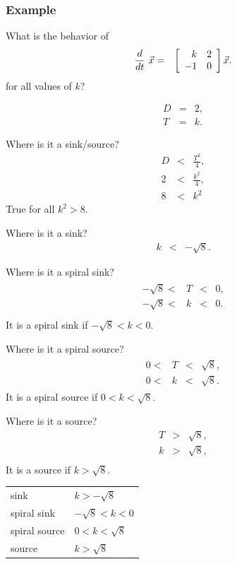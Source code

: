 \begin{frame}
  \frametitle{Example}

  What is the behavior of
  \begin{eqnarray*}
    \deriv{~}{t} \vec{x} & = & \arrayTwo{k}{2}{-1}{0} \vec{x}.
  \end{eqnarray*}
  for all values of $k$?


  {
    \begin{eqnarray*}
      D & = & 2, \\
      T & = & k.
    \end{eqnarray*}
  }



  {
    Where is it a sink/source?
    \begin{eqnarray*}
      D & < & \frac{T^2}{4}, \\
      2 & < & \frac{k^2}{4}, \\
      8 & < & k^2
    \end{eqnarray*}
    True for all $k^2>8$.
  }


  {
    Where is it a sink?
    \begin{eqnarray*}
      k & < & -\sqrt{8}.
    \end{eqnarray*}
  }

  {
    Where is it a spiral sink?
    \begin{eqnarray*}
      \begin{array}{rcccl}
        -\sqrt{8} < & T & < & 0, \\
        -\sqrt{8} < & k & < & 0. \\
      \end{array}
    \end{eqnarray*}
    It is a spiral sink if $-\sqrt{8}<k<0$.
  }

  {
    Where is it a spiral source?
    \begin{eqnarray*}
      \begin{array}{rcccl}
        0 < & T & < & \sqrt{8}, \\
        0 < & k & < & \sqrt{8}.
      \end{array}
    \end{eqnarray*}
    It is a spiral source if $0<k<\sqrt{8}$.
  }

  {
    Where is it a source?
    \begin{eqnarray*}
        T & > & \sqrt{8}, \\
        k & > & \sqrt{8}, \\
    \end{eqnarray*}
    It is a  source if $k>\sqrt{8}$.
  }


  {
    \begin{tabular}{ll}
      sink          & $k>-\sqrt{8}$\\
      spiral sink   & $-\sqrt{8} < k < 0$ \\
      spiral source & $0 < k < \sqrt{8}$ \\
      source        & $k>\sqrt{8}$
    \end{tabular}
  }



\end{frame}




